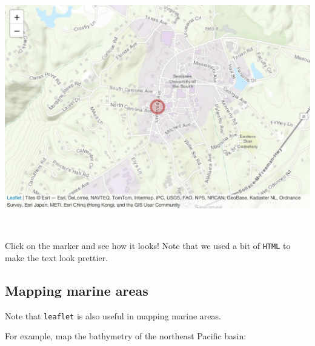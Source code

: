 \documentclass[
]{book}
\newenvironment{Shaded}{\begin{snugshade}}{\end{snugshade}}
\newcommand{\AttributeTok}[1]{\textcolor[rgb]{0.77,0.63,0.00}{#1}}
\newcommand{\DecValTok}[1]{\textcolor[rgb]{0.00,0.00,0.81}{#1}}
\newcommand{\FunctionTok}[1]{\textcolor[rgb]{0.00,0.00,0.00}{#1}}
\newcommand{\NormalTok}[1]{#1}
\newcommand{\SpecialCharTok}[1]{\textcolor[rgb]{0.00,0.00,0.00}{#1}}
\begin{document}
\includegraphics[width=694.08px]{figures/unnamed-chunk-227-1}

~

Click on the marker and see how it looks! Note that we used a bit of \texttt{HTML} to make the text look prettier.

\hypertarget{mapping-marine-areas}{%
\subsection*{Mapping marine areas}\label{mapping-marine-areas}}

Note that \texttt{leaflet} is also useful in mapping marine areas.

For example, map the bathymetry of the northeast Pacific basin:

\begin{Shaded}
\end{Shaded}
\end{document}
